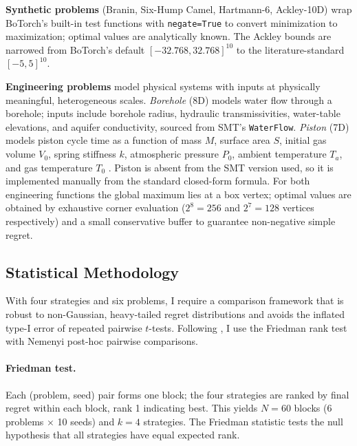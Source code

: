 \textbf{Synthetic problems} (Branin, Six-Hump Camel, Hartmann-6,
Ackley-10D) wrap BoTorch's built-in test functions with
\texttt{negate=True} to convert minimization to maximization;
optimal values are analytically known.
The Ackley bounds are narrowed from BoTorch's default
$[-32.768, 32.768]^{10}$ to the literature-standard $[-5, 5]^{10}$.

\textbf{Engineering problems} model physical systems with inputs at
physically meaningful, heterogeneous scales.
\emph{Borehole} (8D) models water flow through a borehole; inputs
include borehole radius, hydraulic transmissivities, water-table
elevations, and aquifer conductivity, sourced from SMT's
\texttt{WaterFlow}.
\emph{Piston} (7D) models piston cycle time as a function of mass $M$,
surface area $S$, initial gas volume $V_0$, spring stiffness $k$,
atmospheric pressure $P_0$, ambient temperature $T_a$, and gas
temperature $T_0$ \citep{surjanovic2013virtual}.
Piston is absent from the SMT version used, so it is implemented
manually from the standard closed-form formula.
For both engineering functions the global maximum lies at a box vertex;
optimal values are obtained by exhaustive corner evaluation
($2^8 = 256$ and $2^7 = 128$ vertices respectively) and a small
conservative buffer to guarantee non-negative simple regret.

\subsection{Statistical Methodology}
\label{sec:stats}

With four strategies and six problems, I require a comparison
framework that is robust to non-Gaussian, heavy-tailed regret
distributions and avoids the inflated type-I error of repeated
pairwise $t$-tests.
Following \citet{demsar2006statistical}, I use the Friedman rank test
with Nemenyi post-hoc pairwise comparisons.

\paragraph{Friedman test.}
Each (problem, seed) pair forms one block; the four strategies are
ranked by final regret within each block, rank 1 indicating best.
This yields $N = 60$ blocks (6 problems $\times$ 10 seeds) and
$k = 4$ strategies.
The Friedman statistic tests the null hypothesis that all strategies
have equal expected rank.

